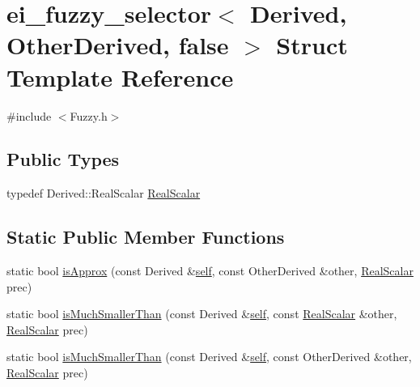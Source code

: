 \hypertarget{structei__fuzzy__selector_3_01_derived_00_01_other_derived_00_01false_01_4}{\section{ei\-\_\-fuzzy\-\_\-selector$<$ Derived, Other\-Derived, false $>$ Struct Template Reference}
\label{structei__fuzzy__selector_3_01_derived_00_01_other_derived_00_01false_01_4}
}


{\ttfamily \#include $<$Fuzzy.\-h$>$}

\subsection*{Public Types}
\begin{DoxyCompactItemize}
\item 
typedef Derived\-::\-Real\-Scalar \hyperlink{structei__fuzzy__selector_3_01_derived_00_01_other_derived_00_01false_01_4_a077755363cee97ee753bde336016bc04}{Real\-Scalar}
\end{DoxyCompactItemize}
\subsection*{Static Public Member Functions}
\begin{DoxyCompactItemize}
\item 
static bool \hyperlink{structei__fuzzy__selector_3_01_derived_00_01_other_derived_00_01false_01_4_aae4032cd9455f941fcdb7c934c9e87c0}{is\-Approx} (const Derived \&\hyperlink{qxtdiscoverableservice_8cpp_a11956026531aa7552f541d9ddc69403d}{self}, const Other\-Derived \&other, \hyperlink{structei__fuzzy__selector_3_01_derived_00_01_other_derived_00_01false_01_4_a077755363cee97ee753bde336016bc04}{Real\-Scalar} prec)
\item 
static bool \hyperlink{structei__fuzzy__selector_3_01_derived_00_01_other_derived_00_01false_01_4_a43220004904e8f01491ccd8f43c3dc31}{is\-Much\-Smaller\-Than} (const Derived \&\hyperlink{qxtdiscoverableservice_8cpp_a11956026531aa7552f541d9ddc69403d}{self}, const \hyperlink{structei__fuzzy__selector_3_01_derived_00_01_other_derived_00_01false_01_4_a077755363cee97ee753bde336016bc04}{Real\-Scalar} \&other, \hyperlink{structei__fuzzy__selector_3_01_derived_00_01_other_derived_00_01false_01_4_a077755363cee97ee753bde336016bc04}{Real\-Scalar} prec)
\item 
static bool \hyperlink{structei__fuzzy__selector_3_01_derived_00_01_other_derived_00_01false_01_4_aaec7ae5a43296973d453d361d9a2e599}{is\-Much\-Smaller\-Than} (const Derived \&\hyperlink{qxtdiscoverableservice_8cpp_a11956026531aa7552f541d9ddc69403d}{self}, const Other\-Derived \&other, \hyperlink{structei__fuzzy__selector_3_01_derived_00_01_other_derived_00_01false_01_4_a077755363cee97ee753bde336016bc04}{Real\-Scalar} prec)
\end{DoxyCompactItemize}


